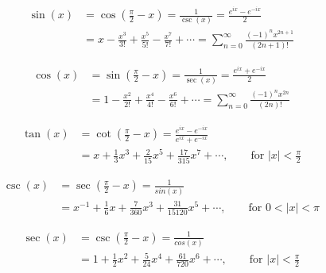 \begin{definition}
    
    
    \begin{equation}\label{sin}
    \begin{aligned}
        \sin(x) & = \cos(\frac{\pi}{2} - x) = \frac{1}{\csc(x)} = \frac{e ^ {ix} - e ^ {-ix}}{2}\\
	            & = x - \frac{x^3}{3!} + \frac{x^5}{5!} - \frac{x^7}{7!} + \cdots = \sum_{n=0}^\infty \frac{(-1)^n x^{2n+1}}{(2n+1)!}
    \end{aligned}
    \end{equation}
    
    \begin{equation}\label{cos}
	\begin{aligned}
        \cos(x) & = \sin(\frac{\pi}{2} - x) = \frac{1}{\sec(x)} = \frac{e ^ {ix} + e ^ {-ix}}{2}\\
		        & = 1 - \frac{x^2}{2!} + \frac{x^4}{4!} - \frac{x^6}{6!} + \cdots = \sum_{n=0}^\infty \frac{(-1)^n x^{2n}}{(2n)!}
	\end{aligned}
    \end{equation}
    
    \begin{equation}\label{tan}
	\begin{aligned}
        \tan(x) & = \cot(\frac{\pi}{2} - x) = \frac{e ^ {ix} - e ^ {-ix}}{e ^ {ix} + e ^ {-ix}}\\
		        & = x + \frac{1}{3}x^3 + \frac{2}{15}x^5 + \frac{17}{315}x^7 + \cdots, \qquad \text{for } |x| < \frac{\pi}{2}
	\end{aligned}
    \end{equation}
    
    \begin{equation}\label{csc}
	\begin{aligned}
        \csc(x) & = \sec(\frac{\pi}{2} - x) = \frac{1}{sin(x)}\\
		        & = x^{-1} + \frac{1}{6}x + \frac{7}{360}x^3 + \frac{31}{15120}x^5 + \cdots, \qquad \text{for } 0 < |x| < \pi
	\end{aligned}
    \end{equation}
    
    \begin{equation}\label{sec}
	\begin{aligned}
        \sec(x) & = \csc(\frac{\pi}{2} - x) = \frac{1}{cos(x)}\\
		        & = 1 + \frac{1}{2}x^2 + \frac{5}{24}x^4 + \frac{61}{720}x^6 + \cdots, \qquad \text{for } |x| < \frac{\pi}{2}
	\end{aligned}
    \end{equation}
    

\end{definition}
